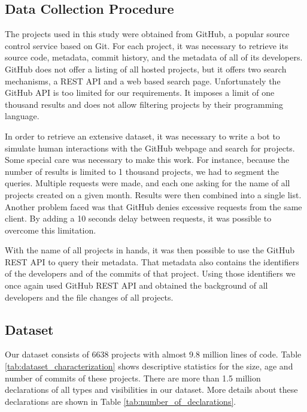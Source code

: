 \documentclass[preprint]{sigplanconf}
\begin{document}
\subsection{Data Collection Procedure\label{dataCollection}}
The projects used in this study were obtained from GitHub, a popular source control service based on Git.
For each project, it was necessary to retrieve its source code, metadata, commit history, and the metadata of all of its developers.
GitHub does not offer a listing of all hosted projects, but it offers two search mechanisms, a REST API and a web based search page.
Unfortunately the GitHub API is too limited for our requirements.
It imposes a limit of one thousand results and does not allow filtering projects by their programming language.

In order to retrieve an extensive dataset, it was necessary to write a bot to simulate human interactions with the GitHub webpage and search for projects. 
Some special care was necessary to make this work. 
For instance, because the number of results is limited to 1 thousand projects, we had to segment the queries.
Multiple requests were made, and each one asking for the name of all projects created on a given month.
Results were then combined into a single list.
Another problem faced was that GitHub denies excessive requests from the same client.
By adding a 10 seconds delay between requests, it was possible to overcome this limitation.

With the name of all projects in hands, it was then possible to use the GitHub REST API to query their metadata.
That metadata also contains the identifiers of the developers and of the commits of that project.
Using those identifiers we once again used GitHub REST API and obtained the background of all developers and the file changes of all projects.


\subsection{Dataset\label{dataset}}


Our dataset consists of 6638 projects with almost 9.8 million lines of code.
Table \ref{tab:dataset_characterization} shows descriptive statistics for the size, age and number of commits of these projects.
There are more than 1.5 million declarations of all types and visibilities in our dataset.
More details about these declarations are shown in Table \ref{tab:number_of_declarations}.
\end{document}
